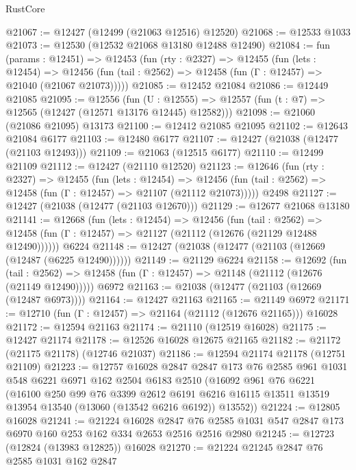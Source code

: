 \begin{lexlean}{RustCore}
\begin{coremodule}
@21067 := @12427 (@12499 (@21063 @12516) @12520)
@21068 := @12533 @1033
@21073 := @12530 (@12532 @21068 @13180 @12488 @12490)
@21084 := fun (params : @12451) =>
  @12453
    (fun (rty : @2327) =>
    @12455
      (fun (lets : @12454) =>
      @12456 (fun (tail : @2562) => @12458 (fun (Γ : @12457) => @21040 (@21067 @21073)))))
@21085 := @12452 @21084
@21086 := @12449 @21085
@21095 := @12556
    (fun (U : @12555) => @12557 (fun (t : @7) => @12565 (@12427 (@12571 @13176 @12445) @12582)))
@21098 := @21060 (@21086 @21095) @13173
@21100 := @12412 @21085 @21095
@21102 := @12643 @21084 @6177
@21103 := @12480 @6177
@21107 := @12427 (@21038 (@12477 (@21103 @12493)))
@21109 := @21063 (@12515 @6177)
@21110 := @12499 @21109
@21112 := @12427 (@21110 @12520)
@21123 := @12646
    (fun (rty : @2327) =>
    @12455
      (fun (lets : @12454) =>
      @12456 (fun (tail : @2562) => @12458 (fun (Γ : @12457) => @21107 (@21112 @21073)))))
    @2498
@21127 := @12427 (@21038 (@12477 (@21103 @12670)))
@21129 := @12677 @21068 @13180
@21141 := @12668
    (fun (lets : @12454) =>
    @12456
      (fun (tail : @2562) =>
      @12458 (fun (Γ : @12457) => @21127 (@21112 (@12676 (@21129 @12488 @12490))))))
    @6224
@21148 := @12427 (@21038 (@12477 (@21103 (@12669 (@12487 (@6225 @12490))))))
@21149 := @21129 @6224
@21158 := @12692
    (fun (tail : @2562) => @12458 (fun (Γ : @12457) => @21148 (@21112 (@12676 (@21149 @12490)))))
    @6972
@21163 := @21038 (@12477 (@21103 (@12669 (@12487 @6973))))
@21164 := @12427 @21163
@21165 := @21149 @6972
@21171 := @12710 (fun (Γ : @12457) => @21164 (@21112 (@12676 @21165))) @16028
@21172 := @12594 @21163
@21174 := @21110 (@12519 @16028)
@21175 := @12427 @21174
@21178 := @12526 @16028 @12675 @21165
@21182 := @21172 (@21175 @21178) (@12746 @21037)
@21186 := @12594 @21174 @21178 (@12751 @21109)
@21223 := @12757
    @16028
    @2847
    @2847
    @173
    @76
    @2585
    @961
    @1031
    @548
    @6221
    @6971
    @162
    @2504
    @6183
    @2510
    (@16092
      @961
      @76
      @6221
      (@16100
        @250
        @99
        @76
        @3399
        @2612
        @6191
        @6216
        @16115
        @13511
        @13519
        @13954
        @13540
        (@13060 (@13542 @6216 @6192))
        @13552))
@21224 := @12805 @16028
@21241 := @21224
    @16028
    @2847
    @76
    @2585
    @1031
    @547
    @2847
    @173
    @6970
    @160
    @253
    @162
    @334
    @2653
    @2516
    @2516
    @2980
@21245 := @12723 (@12824 (@13983 @12825)) @16028
@21270 := @21224
    @21245
    @2847
    @76
    @2585
    @1031
    @162
    @2847

\end{coremodule}
\end{lexlean}
